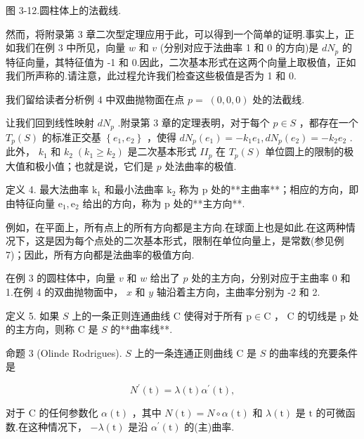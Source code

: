 图 3-12.圆柱体上的法截线.

然而，将附录第 3 章二次型定理应用于此，可以得到一个简单的证明.事实上，正如我们在例 3 中所见，向量 \(w\) 和 \(v\) (分别对应于法曲率 1 和 0 的方向)是 \(d{N}_{p}\) 的特征向量，其特征值为 -1 和 0.因此，二次基本形式在这两个向量上取极值，正如我们所声称的.请注意，此过程允许我们检查这些极值是否为 1 和 0.

我们留给读者分析例 4 中双曲抛物面在点 \(p = \; \left( {0,0,0}\right)\) 处的法截线.

让我们回到线性映射 \(d{N}_{p}\) .附录第 3 章的定理表明，对于每个 \(p \in  S\) ，都存在一个 \({T}_{p}\left( S\right)\) 的标准正交基 \(\left\{  {{e}_{1},{e}_{2}}\right\}\) ，使得 \(d{N}_{p}\left( {e}_{1}\right)  =  - {k}_{1}{e}_{1},d{N}_{p}\left( {e}_{2}\right)  =  - {k}_{2}{e}_{2}\) .此外， \({k}_{1}\) 和 \({k}_{2} \; \left( {{k}_{1} \geq  {k}_{2}}\right)\) 是二次基本形式 \(I{I}_{p}\) 在 \({T}_{p}\left( S\right)\) 单位圆上的限制的极大值和极小值；也就是说，它们是 \(p\) 处法曲率的极值.

定义 4. 最大法曲率 \({\mathrm{k}}_{1}\) 和最小法曲率 \({\mathrm{k}}_{2}\) 称为 \(\mathrm{p}\) 处的**主曲率**；相应的方向，即由特征向量 \({\mathrm{e}}_{1},{\mathrm{e}}_{2}\) 给出的方向，称为 p 处的**主方向**.

例如，在平面上，所有点上的所有方向都是主方向.在球面上也是如此.在这两种情况下，这是因为每个点处的二次基本形式，限制在单位向量上，是常数(参见例 7)；因此，所有方向都是法曲率的极值方向.

在例 3 的圆柱体中，向量 \(v\) 和 \(w\) 给出了 \(p\) 处的主方向，分别对应于主曲率 0 和 1.在例 4 的双曲抛物面中， \(x\) 和 \(y\) 轴沿着主方向，主曲率分别为 -2 和 2.

定义 5. 如果 \(S\) 上的一条正则连通曲线 \(\mathrm{C}\) 使得对于所有 \(\mathrm{p} \in  \mathrm{C}\) ， \(\mathrm{C}\) 的切线是 \(\mathrm{p}\) 处的主方向，则称 \(\mathrm{C}\) 是 \(S\) 的**曲率线**.

命题 3 (Olinde Rodrigues). \(S\) 上的一条连通正则曲线 \(\mathrm{C}\) 是 \(S\) 的曲率线的充要条件是

\[
{N}^{\prime }\left( \mathrm{t}\right)  = \lambda \left( \mathrm{t}\right) {\alpha }^{\prime }\left( \mathrm{t}\right) ,
\]

对于 \(\mathrm{C}\) 的任何参数化 \(\alpha \left( \mathrm{t}\right)\) ，其中 \(N\left( \mathrm{t}\right)  = N \circ  \alpha \left( \mathrm{t}\right)\) 和 \(\lambda \left( \mathrm{t}\right)\) 是 \(\mathrm{t}\) 的可微函数.在这种情况下， \(- \lambda \left( \mathrm{t}\right)\) 是沿 \({\alpha }^{\prime }\left( \mathrm{t}\right)\) 的(主)曲率.

